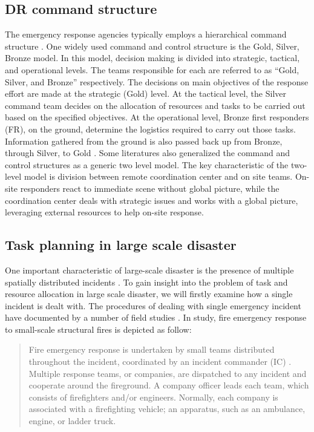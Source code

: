 \subsection{DR command structure}\label{sec:lrstructure}
The emergency response agencies typically employs a hierarchical command structure \cite{Ramchurn2015}. One widely used command and control structure is the Gold, Silver, Bronze model. In this model, decision making is divided into strategic, tactical, and operational levels. The teams responsible for each are referred to as ``Gold, Silver, and Bronze'' respectively. The decisions on main objectives of the response effort are made at the strategic (Gold) level. At the tactical level, the Silver command team decides on the allocation of resources and tasks to be carried out  based on the specified objectives. At the operational level, Bronze first responders (FR), on the ground, determine the logistics required to carry out those tasks. Information gathered from the ground is also passed back up from Bronze, through Silver, to Gold \cite{Ramchurn2015}. Some literatures \cite{Chen2005,Chen2008} also generalized the command and control structures as a generic two level model. The key characteristic of the two-level model is division between remote coordination center and on site teams.  On-site responders react to immediate scene without global picture, while the coordination center deals with strategic issues and works with a global picture, leveraging external resources to help on-site response. \\


\subsection{Task planning in large scale disaster} \label{sec:LRtaskplanning}
One important characteristic of large-scale disaster is the presence of multiple spatially distributed incidents \cite{Chen2005}. To gain insight into the problem of task and resource allocation in large scale disaster, we will firstly examine how a single incident is dealt with. The procedures of dealing with single emergency incident have documented by a number of field studies \cite{Comfort2004,Dawes2004,Petrescu-prahova2005}. In \cite{Toups2011} study, fire emergency response to small-scale structural fires is depicted as follow: 

\begin{quote}
Fire emergency response is undertaken by small teams distributed throughout the incident, coordinated by an incident commander (IC) . Multiple response teams, or companies, are dispatched to any incident and cooperate around the fireground. A company officer leads each team, which consists of firefighters and/or engineers. Normally, each company is associated with a firefighting vehicle; an apparatus, such as an ambulance, engine, or ladder truck.\\
\end{quote}

